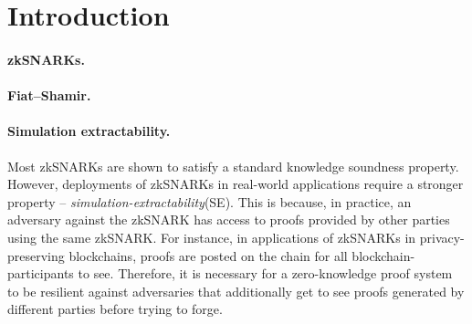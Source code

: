 \begin{comment}
    \item Classical definition of KS is not enough in applications: 
    More generaly, the classical definition of KS seems to be unsatisfactory in applications, as it does not provide sufficient security guarantees for SNARKs in the following sense: 
    The natural belief that seeing a valid proof only tells a verifier that the prover knew a satisfactory witness is simply not true. In the context of malleable SNARKs, seeing other valid proofs allows one to construct related proofs   whithout knowing any witness. 
    \item Allowing for malleability makes it difficult to reason about the security properties of SNARKs. Ignoring the ability of an adversary to see other valid proofs prevents from modeling a realistic definition. 
    \item Generic lifting techniques / compilers have overheads and are unnecessary to be applied to schemes for which we can directly show they satisfy our definitions. 
    
\end{itemize}

\chaya{notes: end}
\end{comment}

\section{Introduction}

\paragraph{zkSNARKs.}

\paragraph{Fiat--Shamir.}

\paragraph{Simulation extractability.}
Most zkSNARKs are shown to satisfy a standard knowledge soundness property. However, deployments of zkSNARKs in real-world applications require a stronger property -- 
\textit{simulation-extractability}(SE). 
This is because, in practice, an adversary against the zkSNARK has access to proofs provided by other parties using the same
zkSNARK. For instance, in applications of
zkSNARKs in privacy-preserving blockchains, proofs are posted on the chain for all
blockchain-participants to see. Therefore, it is necessary for
a zero-knowledge proof system to be resilient against adversaries that additionally get to see proofs generated by different parties before trying to forge.

